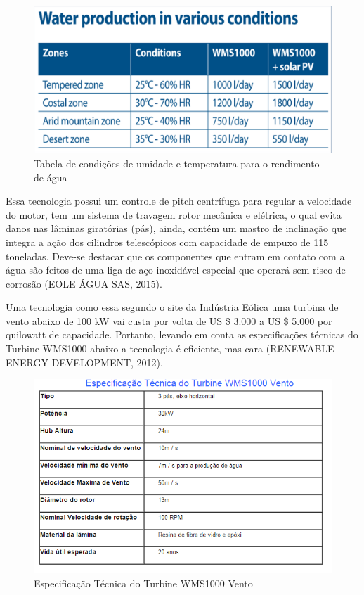 \documentclass[12pt,openright,oneside,a4paper,brazil]{abntex2}
\begin{document}
\begin{figure}[!htbp]
\centering
\includegraphics[scale=0.3]{condicoes}
\caption[Caption title in LOF]{Tabela de condições de umidade e temperatura para o rendimento de água \footnotemark}
\FloatBarrier
\label{condicoes}
\end{figure}

Essa tecnologia possui um controle de pitch centrífuga para regular a velocidade do motor, tem um sistema de travagem rotor mecânica e elétrica, o qual evita danos nas lâminas giratórias (pás), ainda, contém um mastro de inclinação que integra a ação dos cilindros telescópicos com capacidade de empuxo de 115 toneladas. Deve-se destacar que os componentes que entram em contato com a água são feitos de uma liga de aço inoxidável especial que operará sem risco de corrosão (EOLE ÁGUA SAS, 2015).

	Uma tecnologia como essa segundo o site da Indústria Eólica uma turbina de vento abaixo de 100 kW vai custa por volta de US \$ 3.000 a US \$ 5.000  por quilowatt de capacidade. Portanto, levando em conta as especificações técnicas do Turbine WMS1000 abaixo a tecnologia é eficiente, mas cara (RENEWABLE ENERGY DEVELOPMENT, 2012).
	
\begin{figure}[!htbp]
\centering
\includegraphics[scale=0.8]{especificacao}
\caption[Caption title in LOF]{Especificação Técnica do Turbine WMS1000 Vento \footnotemark}
\FloatBarrier
\label{Especificacoes}
\end{figure}
 
\end{document}
